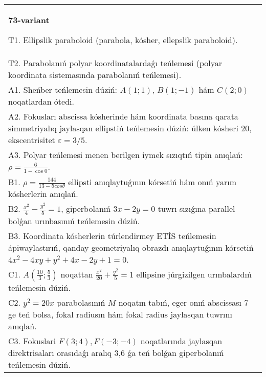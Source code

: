 \documentclass{article}
\begin{document}
\begin{tabular}{m{17cm}}
\textbf{73-variant}
\newline

T1. Ellipslik paraboloid (parabola, kósher, ellepslik paraboloid).\\

T2. Parabolanıń polyar koordinatalardaǵı teńlemesi (polyar koordinata sistemasında parabolanıń teńlemesi).\\

A1. Sheńber teńlemesin dúziń: $A (1;1) $, $B (1;-1) $ hám $C (2;0) $ noqatlardan ótedi.\\

A2. Fokusları abscissa kósherinde hám koordinata basına qarata simmetriyalıq jaylasqan ellipstiń teńlemesin dúziń: úlken kósheri $20$, ekscentrisitet $\varepsilon=3/5$.\\

A3. Polyar teńlemesi menen berilgen iymek sızıqtıń tipin anıqlań: $\rho=\frac{6}{1-\cos 0}$.\\

B1. $\rho = \frac{144}{13 - 5cos\theta}$ ellipsti anıqlaytuǵının kórsetiń hám onıń yarım kósherlerin anıqlań.\\

B2. $\frac{x^{2}}{4} - \frac{y^{2}}{5} = 1$, giperbolanıń $3x - 2y = 0$ tuwrı sızıǵına parallel bolǵan urınbasınıń teńlemesin dúziń.  \\

B3. Koordinata kósherlerin túrlendirmey ETİS teńlemesin ápiwaylastırıń, qanday geometriyalıq obrazdı anıqlaytuǵının kórsetiń $4x^{2} - 4xy + y^{2} + 4x - 2y + 1 = 0$.  \\

C1. $A(\frac{10}{3};\frac{5}{3})$ noqattan $\frac{x^{2}}{20} + \frac{y^{2}}{5} = 1$ ellipsine júrgizilgen urınbalardıń teńlemesin dúziń.  \\

C2. $y^{2} = 20x$ parabolasınıń $M$ noqatın tabıń, eger onıń abscissası 7 ge teń bolsa, fokal radiusın hám fokal radius jaylasqan tuwrını anıqlań.\\

C3. Fokuslari $F(3;4), F(-3;-4)$ noqatlarında jaylasqan direktrisaları orasıdaǵı aralıq 3,6 ǵa teń bolǵan giperbolanıń teńlemesin dúziń.  \\

\end{tabular}
\vspace{1cm}
\end{document}

